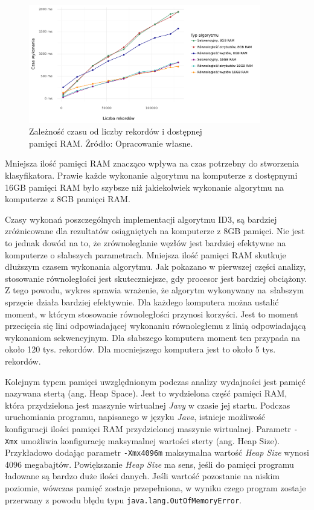 \documentclass[12pt]{article}
\begin{document}
\begin{figure}[H]
    \centering
	\includegraphics[width=0.9\textwidth]{analysis-ram.pdf}
    \caption{Zależność czasu od liczby rekordów i dostępnej\\pamięci RAM. Źródło: Opracowanie własne.}
    \label{fig:analysis-ram}
\end{figure}

Mniejsza ilość pamięci RAM znacząco wpływa na czas potrzebny do stworzenia klasyfikatora.
Prawie każde wykonanie algorytmu na komputerze z dostępnymi 16GB pamięci RAM było szybsze niż
jakiekolwiek wykonanie algorytmu na komputerze z 8GB pamięci RAM.

Czasy wykonań poszczególnych implementacji algorytmu ID3, są bardziej zróżnicowane dla rezultatów
osiągniętych na komputerze z 8GB pamięci.
Nie jest to jednak dowód na to, że zrównoleglanie węzłów jest bardziej efektywne
na komputerze o słabszych parametrach. Mniejsza ilość pamięci RAM skutkuje dłuższym
czasem wykonania algorytmu. Jak pokazano w pierwszej części analizy, stosowanie równoległości jest skuteczniejsze,
gdy procesor jest bardziej obciążony. Z tego powodu, wykres sprawia wrażenie, że algorytm wykonywany na~słabszym
sprzęcie działa bardziej efektywnie.
Dla każdego komputera można ustalić moment, w którym stosowanie równoległości przynosi korzyści. Jest to moment
przecięcia się lini odpowiadającej wykonaniu równoległemu z linią odpowiadającą wykonaniom sekwencyjnym.
Dla słabszego komputera moment ten przypada na około 120 tys. rekordów. Dla mocniejszego komputera
jest to około 5 tys. rekordów.

Kolejnym typem pamięci uwzględnionym podczas analizy wydajności jest pamięć nazywana stertą (ang. Heap Space). Jest to wydzielona
część pamięci RAM, która przydzielona jest maszynie wirtualnej \textit{Javy} w czasie jej startu.
Podczas uruchomiania programu, napisanego w języku \textit{Java}, istnieje możliwość konfiguracji ilości
pamięci RAM przydzielonej maszynie wirtualnej. Parametr \verb|-Xmx| umożliwia konfigurację maksymalnej
wartości sterty (ang. Heap Size). Przykładowo dodając parametr \verb|-Xmx4096m|
maksymalna wartość \textit{Heap Size} wynosi 4096 megabajtów. Powiększanie \textit{Heap Size} ma sens, jeśli do pamięci programu
ładowane są bardzo duże ilości danych. Jeśli wartość pozostanie na niskim poziomie, wówczas pamięć zostaje przepełniona, w wyniku czego
program zostaje przerwany z powodu błędu typu \verb|java.lang.OutOfMemoryError|.
\end{document}

